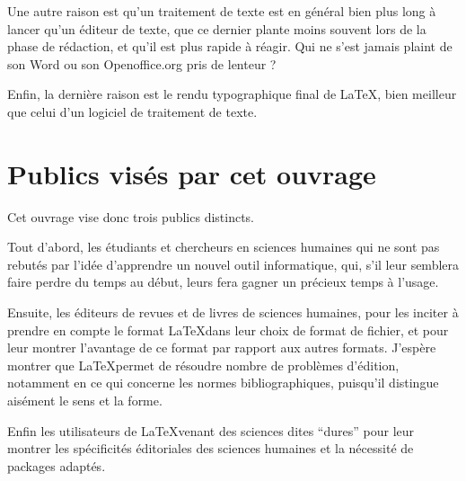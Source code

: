Une autre raison est qu'un traitement de texte est en général bien plus long à lancer qu'un éditeur de texte, que ce dernier plante moins souvent lors de la phase de rédaction, et qu'il est plus rapide à réagir. Qui ne s'est jamais plaint de son Word ou son Openoffice.org pris de lenteur ?

Enfin, la dernière raison est le rendu typographique final de \LaTeX, bien meilleur que celui d'un logiciel de traitement de texte.


\section{Publics visés par cet ouvrage}

Cet ouvrage vise donc trois publics distincts.

Tout d'abord, les étudiants et chercheurs en sciences humaines qui ne sont pas rebutés par l'idée d'apprendre un nouvel outil informatique, qui, s'il leur semblera faire perdre du temps au début, leurs fera gagner un précieux temps à l'usage.

Ensuite, les éditeurs de revues et de livres de sciences humaines, pour les inciter à prendre en compte le format \LaTeX dans leur choix de format de fichier, et pour leur montrer l'avantage de ce format par rapport aux autres formats. J'espère montrer que \LaTeX permet de résoudre nombre de problèmes d'édition, notamment en ce qui concerne les normes bibliographiques, puisqu'il distingue aisément le sens et la forme.

Enfin les utilisateurs de \LaTeX venant des sciences dites \enquote{dures} pour leur montrer les spécificités éditoriales des sciences humaines et la nécessité de packages adaptés.

